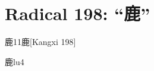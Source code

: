 
\section*{Radical 198: ``⿅''}

\begin{Entry}{鹿}{11}{⿅}[Kangxi 198]
  \begin{Phonetics}{鹿}{lu4}
  \end{Phonetics}
\end{Entry}


